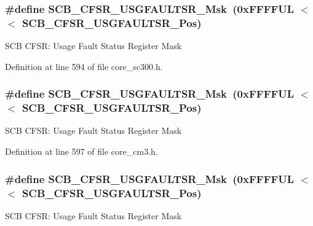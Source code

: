\subsubsection[{\texorpdfstring{S\+C\+B\+\_\+\+C\+F\+S\+R\+\_\+\+U\+S\+G\+F\+A\+U\+L\+T\+S\+R\+\_\+\+Msk}{SCB_CFSR_USGFAULTSR_Msk}}]{\setlength{\rightskip}{0pt plus 5cm}\#define S\+C\+B\+\_\+\+C\+F\+S\+R\+\_\+\+U\+S\+G\+F\+A\+U\+L\+T\+S\+R\+\_\+\+Msk~(0x\+F\+F\+F\+F\+U\+L $<$$<$ S\+C\+B\+\_\+\+C\+F\+S\+R\+\_\+\+U\+S\+G\+F\+A\+U\+L\+T\+S\+R\+\_\+\+Pos)}\hypertarget{group___c_m_s_i_s___s_c_b_ga565807b1a3f31891f1f967d0fa30d03f}{}\label{group___c_m_s_i_s___s_c_b_ga565807b1a3f31891f1f967d0fa30d03f}
S\+CB C\+F\+SR\+: Usage Fault Status Register Mask 

Definition at line 594 of file core\+\_\+sc300.\+h.

\subsubsection[{\texorpdfstring{S\+C\+B\+\_\+\+C\+F\+S\+R\+\_\+\+U\+S\+G\+F\+A\+U\+L\+T\+S\+R\+\_\+\+Msk}{SCB_CFSR_USGFAULTSR_Msk}}]{\setlength{\rightskip}{0pt plus 5cm}\#define S\+C\+B\+\_\+\+C\+F\+S\+R\+\_\+\+U\+S\+G\+F\+A\+U\+L\+T\+S\+R\+\_\+\+Msk~(0x\+F\+F\+F\+F\+U\+L $<$$<$ S\+C\+B\+\_\+\+C\+F\+S\+R\+\_\+\+U\+S\+G\+F\+A\+U\+L\+T\+S\+R\+\_\+\+Pos)}\hypertarget{group___c_m_s_i_s___s_c_b_ga565807b1a3f31891f1f967d0fa30d03f}{}\label{group___c_m_s_i_s___s_c_b_ga565807b1a3f31891f1f967d0fa30d03f}
S\+CB C\+F\+SR\+: Usage Fault Status Register Mask 

Definition at line 597 of file core\+\_\+cm3.\+h.

\subsubsection[{\texorpdfstring{S\+C\+B\+\_\+\+C\+F\+S\+R\+\_\+\+U\+S\+G\+F\+A\+U\+L\+T\+S\+R\+\_\+\+Msk}{SCB_CFSR_USGFAULTSR_Msk}}]{\setlength{\rightskip}{0pt plus 5cm}\#define S\+C\+B\+\_\+\+C\+F\+S\+R\+\_\+\+U\+S\+G\+F\+A\+U\+L\+T\+S\+R\+\_\+\+Msk~(0x\+F\+F\+F\+F\+U\+L $<$$<$ S\+C\+B\+\_\+\+C\+F\+S\+R\+\_\+\+U\+S\+G\+F\+A\+U\+L\+T\+S\+R\+\_\+\+Pos)}\hypertarget{group___c_m_s_i_s___s_c_b_ga565807b1a3f31891f1f967d0fa30d03f}{}\label{group___c_m_s_i_s___s_c_b_ga565807b1a3f31891f1f967d0fa30d03f}
S\+CB C\+F\+SR\+: Usage Fault Status Register Mask 

